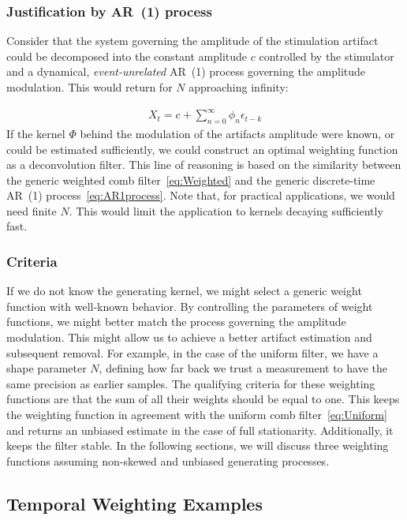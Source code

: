 \documentclass[a4paper]{article}
\begin{document}
\subsubsection{Justification by AR~(1) process}

Consider that the system governing the amplitude of the stimulation artifact could be decomposed into the constant amplitude $c$ controlled by the stimulator and a dynamical, \emph{event-unrelated} AR~(1) process governing the amplitude modulation. This would return for $N$ approaching infinity:

\begin{align}
    X_{t} = c + \sum_{n=0}^{\infty} \phi_n \epsilon_{t-k}\label{eq:AR1process}
\end{align}
If the kernel $\Phi$  behind the modulation of the artifacts amplitude were known, or could be estimated sufficiently, we could construct an optimal weighting function as a deconvolution filter.
This line of reasoning is based on the similarity between the generic weighted comb filter~\eqref{eq:Weighted} and the generic discrete-time AR~(1) process~\eqref{eq:AR1process}.
Note that, for practical applications, we would need finite $N$. This would limit the application to kernels decaying sufficiently fast.

\subsubsection{Criteria}

If we do not know the generating kernel, we might select a generic weight function with well-known behavior. By controlling the parameters of weight functions, we might better match the process governing the amplitude modulation. This might allow us to achieve a better artifact estimation and subsequent removal.
For example, in the case of the uniform filter, we have a shape parameter $N$, defining how far back we trust a measurement to have the same precision as earlier samples.
The qualifying criteria for these weighting functions are that the sum of all their weights should be equal to one. This keeps the weighting function in agreement with the uniform comb filter~\eqref{eq:Uniform} and returns an unbiased estimate in the case of full stationarity. Additionally, it keeps the filter stable. In the following sections, we will discuss three weighting functions assuming non-skewed and unbiased generating processes.

\subsection{Temporal Weighting Examples}
\end{document}
